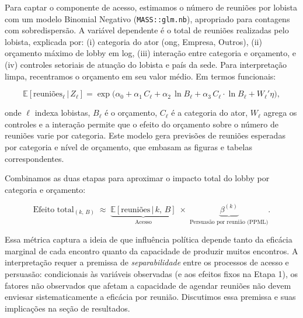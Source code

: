 Para captar o componente de acesso, estimamos o número de reuniões por lobista com um modelo Binomial Negativo (\texttt{MASS::glm.nb}), apropriado para contagens com sobredispersão. A variável dependente é o total de reuniões realizadas pelo lobista, explicada por: (i) categoria do ator (\acrshort{ong}, Empresa, Outros), (ii) orçamento máximo de lobby em log, (iii) interação entre categoria e orçamento, e (iv) controles setoriais de atuação do lobista e país da sede. Para interpretação limpa, recentramos o orçamento em seu valor médio. Em termos funcionais:

\begin{equation}
    \mathbb{E}[\text{reuniões}_\ell\,|\,Z_\ell] = \exp\big(\alpha_0 + \alpha_1\,C_\ell + \alpha_2\,\ln B_\ell + \alpha_3\,C_\ell\cdot\ln B_\ell + W_\ell'\eta\big),
\end{equation}

onde $\ell$ indexa lobistas, $B_\ell$ é o orçamento, $C_\ell$ é a categoria do ator, $W_\ell$ agrega os controles e a interação permite que o efeito do orçamento sobre o número de reuniões varie por categoria. Este modelo gera previsões de reuniões esperadas por categoria e nível de orçamento, que embasam as figuras e tabelas correspondentes.

Combinamos as duas etapas para aproximar o impacto total do lobby por categoria e orçamento:

\begin{equation}
    \text{Efeito total}_{(k,\,B)} \;\approx\; \underbrace{\mathbb{E}[\text{reuniões}\,|\,k,\,B]}_{\text{Acesso}}\;\times\; \underbrace{\beta^{(k)}}_{\text{Persuasão por reunião (PPML)}}.
\end{equation}

Essa métrica captura a ideia de que influência política depende tanto da eficácia marginal de cada encontro quanto da capacidade de produzir muitos encontros. A interpretação requer a premissa de \textit{separabilidade} entre os processos de acesso e persuasão: condicionais às variáveis observadas (e aos efeitos fixos na Etapa 1), os fatores não observados que afetam a capacidade de agendar reuniões não devem enviesar sistematicamente a eficácia por reunião. Discutimos essa premissa e suas implicações na seção de resultados.


